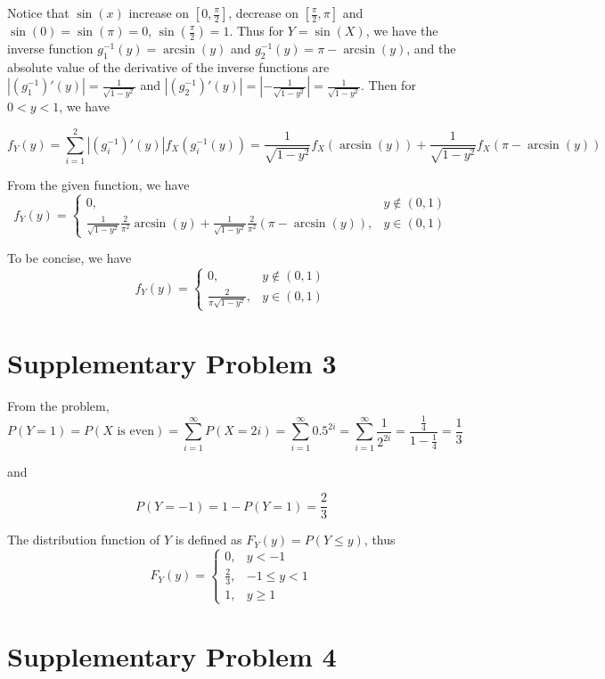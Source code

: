 \documentclass[a4paper, UTF-8]{article}
\theoremstyle{plain}
\begin{document}
Notice that $\sin(x)$ increase on $[0, \frac{\pi}{2}]$, decrease on $[\frac{\pi}{2}, \pi]$ and $\sin(0) = \sin(\pi) = 0$, $\sin(\frac{\pi}{2}) = 1$. Thus for $Y = \sin(X)$, we have 
the inverse function $g_1^{-1}(y) = \arcsin(y)$ and $g_2^{-1}(y) = \pi - \arcsin(y)$, and the absolute value of the derivative of the inverse functions are $|(g_1^{-1})'(y)| = \frac{1}{\sqrt{1-y^2}}$ and $\left|(g_2^{-1})'(y)\right| = \left|-\frac{1}{\sqrt{1-y^2}}\right| = \frac{1}{\sqrt{1-y^2}}$. Then for $0 < y < 1$, we have

$$
f_Y(y) = \sum_{i=1}^2 \left|(g_i^{-1})'(y)\right| f_X(g_i^{-1}(y)) = \frac{1}{\sqrt{1-y^2}} f_X(\arcsin(y)) + \frac{1}{\sqrt{1-y^2}} f_X(\pi - \arcsin(y))
$$

From the given function, we have 
$$
f_Y(y) = \begin{cases}
0, & y \notin (0, 1) \\
\frac{1}{\sqrt{1-y^2}} \frac{2}{\pi^2} \arcsin(y) + \frac{1}{\sqrt{1-y^2}} \frac{2}{\pi^2} (\pi - \arcsin(y)), & y \in (0, 1)
\end{cases}
$$

To be concise, we have
$$
f_Y(y) = \begin{cases}
0, & y \notin (0, 1) \\
\frac{2}{\pi \sqrt{1-y^2}}, & y \in (0, 1)
\end{cases}
$$

\section{Supplementary Problem 3}

From the problem, 
$$
P(Y = 1) = P(X \text{ is even}) = \sum_{i = 1}^\infty P(X = 2i) = \sum_{i = 1}^\infty 0.5^{2i} = \sum_{i = 1}^\infty \frac{1}{2^{2i}} = \frac{\frac{1}{4}}{1 - \frac{1}{4}} = \frac{1}{3}
$$

and

$$
P(Y = -1) = 1 - P(Y = 1) = \frac{2}{3}
$$

The distribution function of $Y$ is defined as $F_Y(y) = P(Y \leq y)$, thus
$$
F_Y(y) = \begin{cases}
0, & y < -1 \\
\frac{2}{3}, & -1 \leq y < 1 \\
1, & y \geq 1
\end{cases}
$$

\section{Supplementary Problem 4}
\end{document}
